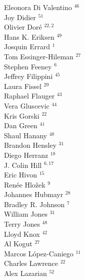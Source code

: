 \documentclass[PICOReport.tex]{subfiles}
\begin{document}
{\begin{multicols}{4}
Eleonora Di Valentino $^{46}$           \\
Joy Didier $^{51}$                      \\
Olivier Dor\'e $^{22,2}$                  \\
Hans K. Eriksen $^{49}$                 \\
Josquin Errard $^{1}$                  \\
Tom Essinger-Hileman $^{27}$            \\
Stephen Feeney $^{6}$                  \\
Jeffrey Filippini $^{45}$               \\
Laura Fissel $^{29}$                    \\
Raphael Flauger $^{43}$                 \\
Vera Gluscevic $^{44}$                  \\
Kris Gorski $^{22}$                     \\
Dan Green $^{41}$                       \\
Shaul Hanany $^{48}$                    \\
Brandon Hensley $^{31}$                 \\
Diego Herranz $^{18}$                   \\
J. Colin Hill $^{6,17}$                   \\
Eric Hivon $^{15}$                      \\
Ren\'{e}e  Hlo\v{z}ek $^{9}$           \\
Johannes Hubmayr $^{28}$                \\
Bradley R. Johnson $^{7}$              \\
William Jones $^{31}$                   \\
Terry Jones $^{48}$                     \\
Lloyd Knox $^{42}$                      \\
Al Kogut $^{27}$                        \\
Marcos L\'{o}pez-Caniego $^{11}$        \\
Charles Lawrence $^{22}$                \\
Alex Lazarian $^{52}$                   \\

\end{multicols}}
\end{document}
